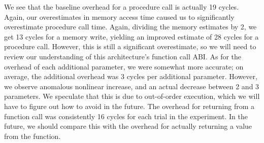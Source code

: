 \noindent We see that the baseline overhead for a procedure call is actually 19 cycles. Again, our overestimates in memory access time caused us to significantly overestimate procedure call time. Again, dividing the memory estimates by 2, we get 13 cycles for a memory write, yielding an improved estimate of 28 cycles for a procedure call. However, this is still a significant overestimate, so we will need to review our understanding of this architecture's function call ABI. As for the overhead of each additional parameter, we were somewhat more accurate; on average, the additional overhead was 3 cycles per additional parameter. However, we observe anomalous nonlinear increase, and an actual decrease between 2 and 3 parameters. We speculate that this is due to out-of-order execution, which we will have to figure out how to avoid in the future.
\newline
\newline
The overhead for returning from a function call was consistently 16 cycles for each trial in the experiment. In the future, we should compare this with the overhead for actually returning a value from the function.
